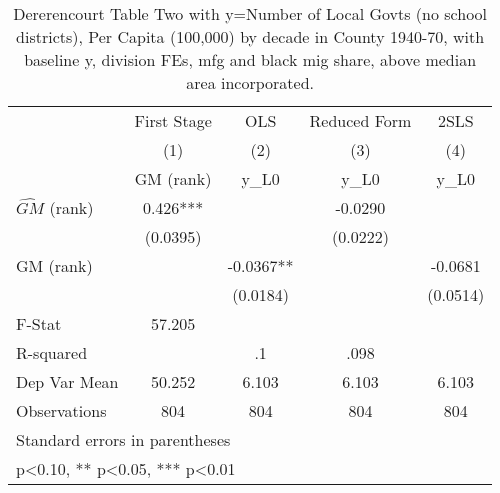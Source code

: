 \begin{table}[htbp]\centering
\def\sym#1{\ifmmode^{#1}\else\(^{#1}\)\fi}
\caption{Dererencourt Table Two with y=Number of Local Govts (no school districts), Per Capita (100,000) by decade in County 1940-70, with baseline y, division FEs, mfg and black mig share, above median area incorporated.}
\begin{tabular}{l*{4}{c}}
\toprule
                    & First Stage   &         OLS   &Reduced Form   &        2SLS   \\
                    &\multicolumn{1}{c}{(1)}&\multicolumn{1}{c}{(2)}&\multicolumn{1}{c}{(3)}&\multicolumn{1}{c}{(4)}\\
                    &\multicolumn{1}{c}{GM  (rank)}&\multicolumn{1}{c}{y\_L0}&\multicolumn{1}{c}{y\_L0}&\multicolumn{1}{c}{y\_L0}\\
\midrule
$\hat{GM}$ (rank)   &       0.426***&               &     -0.0290   &               \\
                    &    (0.0395)   &               &    (0.0222)   &               \\
\addlinespace
GM  (rank)          &               &     -0.0367** &               &     -0.0681   \\
                    &               &    (0.0184)   &               &    (0.0514)   \\
\midrule
F-Stat              &      57.205   &               &               &               \\
R-squared           &               &          .1   &        .098   &               \\
Dep Var Mean        &      50.252   &       6.103   &       6.103   &       6.103   \\
Observations        &         804   &         804   &         804   &         804   \\
\bottomrule
\multicolumn{5}{l}{\footnotesize Standard errors in parentheses}\\
\multicolumn{5}{l}{\footnotesize * p<0.10, ** p<0.05, *** p<0.01}\\
\end{tabular}
\end{table}
